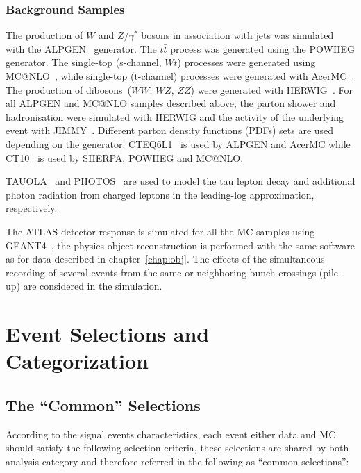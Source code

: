 \subsubsection{Background Samples}
The production of $W$ and $Z/\gamma^*$ bosons in association with jets
was simulated with the ALPGEN~\cite{Alpgen} generator. 
The $t\bar{t}$ process was generated using the POWHEG generator. The single-top (s-channel, $Wt$)
processes were generated using MC@NLO~\cite{MCatNLO}, while single-top
(t-channel) processes were generated with AcerMC~\cite{AcerMC}.  The
production of dibosons~($WW$, $WZ$, $ZZ$) were generated with
HERWIG~\cite{Herwig}.  For all ALPGEN and MC@NLO samples described
above, the parton shower and hadronisation were simulated with HERWIG
and the activity of the underlying event with JIMMY~\cite{JIMMY}.
Different parton density functions (PDFs) sets are used depending on
the generator: CTEQ6L1~\cite{CTEQ6} is used by ALPGEN and AcerMC while
CT10~\cite{CT10} is used by SHERPA, POWHEG and MC@NLO. 

TAUOLA~\cite{TAUOLA} and PHOTOS~\cite{PHOTOS} are used to model the
tau lepton decay and additional photon radiation from charged leptons
in the leading-log approximation, respectively.

The ATLAS detector response is simulated for all the MC samples using GEANT4~\cite{Geant4,ATLASSIM},
the physics object reconstruction is performed with the same software as for data described in chapter~\ref{chap:obj}.
The effects of the simultaneous recording of several events from the
same or neighboring bunch crossings (pile-up) are considered in the
simulation. 



\section{Event Selections and Categorization}\label{sec:selection}


\subsection{The ``Common'' Selections}\label{sec:presel}

According to the signal events characteristics, each event either data and MC should satisfy
the following selection criteria, these selections are shared by both analysis category and therefore 
referred in the following as ``common selections'':


